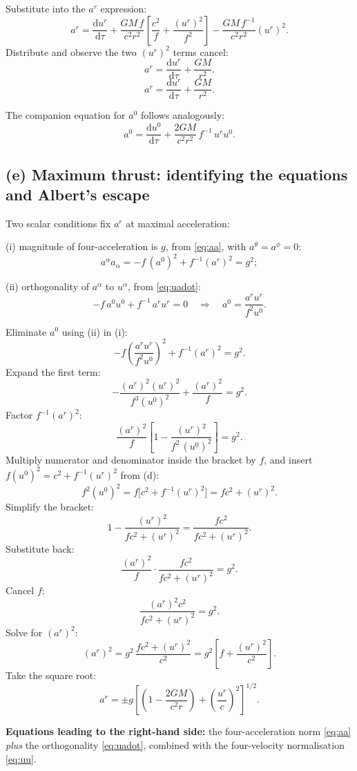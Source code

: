 \documentclass[11pt]{article}
\newcommand{\de}{\mathrm{d}}
\begin{document}
Substitute into the $a^r$ expression:
\[
a^r = \frac{\de u^r}{\de\tau} + \frac{GM\,f}{c^2 r^2}\left[\frac{c^2}{f} + \frac{(u^r)^2}{f^2}\right] - \frac{GM\,f^{-1}}{c^2 r^2}(u^r)^2.
\]
Distribute and observe the two $(u^r)^2$ terms cancel:
\[
a^r = \frac{\de u^r}{\de\tau} + \frac{GM}{r^2}.
\]
\[
\boxed{\;a^r = \frac{\de u^r}{\de\tau} + \frac{GM}{r^2}.\;}
\label{eq:ar-result}
\]

The companion equation for $a^0$ follows analogously:
\[
\boxed{\;a^0 = \frac{\de u^0}{\de\tau} + \frac{2GM}{c^2 r^2}\,f^{-1}\,u^r u^0.\;}
\label{eq:a0-result}
\]

\subsection*{(e) Maximum thrust: identifying the equations and Albert's escape}

Two scalar conditions fix $a^r$ at maximal acceleration:

(i) magnitude of four-acceleration is $g$, from \eqref{eq:aa}, with $a^\theta=a^\phi=0$:
\[
a^\alpha a_\alpha = -f\,(a^0)^2 + f^{-1}(a^r)^2 = g^2;
\]

(ii) orthogonality of $a^\alpha$ to $u^\alpha$, from \eqref{eq:uadot}:
\[
-f\,a^0 u^0 + f^{-1}\,a^r u^r = 0\quad\Longrightarrow\quad a^0 = \frac{a^r u^r}{f^2 u^0}.
\]

Eliminate $a^0$ using (ii) in (i):
\[
-f\left(\frac{a^r u^r}{f^2 u^0}\right)^{2} + f^{-1}(a^r)^2 = g^2.
\]
Expand the first term:
\[
-\frac{(a^r)^2 (u^r)^2}{f^3 (u^0)^2} + \frac{(a^r)^2}{f} = g^2.
\]
Factor $f^{-1}(a^r)^2$:
\[
\frac{(a^r)^2}{f}\left[1 - \frac{(u^r)^2}{f^2\,(u^0)^2}\right] = g^2.
\]
Multiply numerator and denominator inside the bracket by $f$, and insert $f(u^0)^2 = c^2 + f^{-1}(u^r)^2$ from (d):
\[
f^2 (u^0)^2 = f\bigl[c^2 + f^{-1}(u^r)^2\bigr] = f c^2 + (u^r)^2.
\]
Simplify the bracket:
\[
1 - \frac{(u^r)^2}{f c^2 + (u^r)^2} = \frac{f c^2}{f c^2 + (u^r)^2}.
\]
Substitute back:
\[
\frac{(a^r)^2}{f}\cdot \frac{f c^2}{f c^2 + (u^r)^2} = g^2.
\]
Cancel $f$:
\[
\frac{(a^r)^2 c^2}{f c^2 + (u^r)^2} = g^2.
\]
Solve for $(a^r)^2$:
\[
(a^r)^2 = g^2\,\frac{f c^2 + (u^r)^2}{c^2} = g^2\left[f + \frac{(u^r)^2}{c^2}\right].
\]
Take the square root:
\[
\boxed{\;a^r = \pm g\left[\left(1 - \frac{2GM}{c^2 r}\right) + \left(\frac{u^r}{c}\right)^2\right]^{1/2}.\;}
\label{eq:ar-max}
\]

\textbf{Equations leading to the right-hand side:} the four-acceleration norm \eqref{eq:aa} \emph{plus} the orthogonality \eqref{eq:uadot}, combined with the four-velocity normalisation \eqref{eq:uu}.
\end{document}
